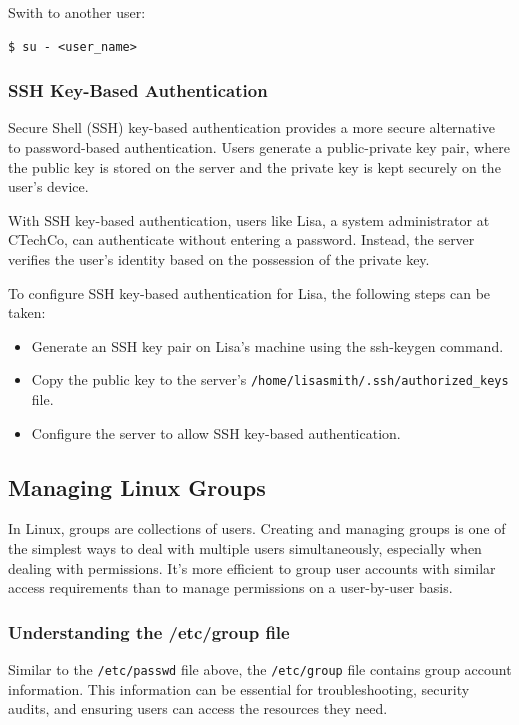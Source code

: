 \documentclass{article}
\newenvironment{codetemplate}[1][]{%
  \mybasecolorbox[#1]
  \itshape
}{%
  \endmybasecolorbox
}
\begin{document}
Swith to another user:
\begin{codetemplate}{}
\begin{verbatim}
$ su - <user_name>
\end{verbatim}
\end{codetemplate}


\subsubsection{SSH Key-Based Authentication}
Secure Shell (SSH) key-based authentication provides a more secure alternative to password-based authentication. Users generate a public-private key pair, where the public key is stored on the server and the private key is kept securely on the user's device.

With SSH key-based authentication, users like Lisa, a system administrator at CTechCo, can authenticate without entering a password. Instead, the server verifies the user's identity based on the possession of the private key.

To configure SSH key-based authentication for Lisa, the following steps can be taken:

\begin{itemize}
    \item Generate an SSH key pair on Lisa's machine using the ssh-keygen command.
    \item Copy the public key to the server's \verb|/home/lisasmith/.ssh/authorized_keys| file.
    \item Configure the server to allow SSH key-based authentication.
\end{itemize}


\subsection{Managing Linux Groups}
In Linux, groups are collections of users. Creating and managing groups is one of the simplest ways to deal with multiple users simultaneously, especially when dealing with permissions. It's more efficient to group user accounts with similar access requirements than to manage permissions on a user-by-user basis.


\subsubsection{Understanding the /etc/group file}
Similar to the \verb|/etc/passwd| file above, the \verb|/etc/group| file contains group account information. This information can be essential for troubleshooting, security audits, and ensuring users can access the resources they need.
\end{document}
